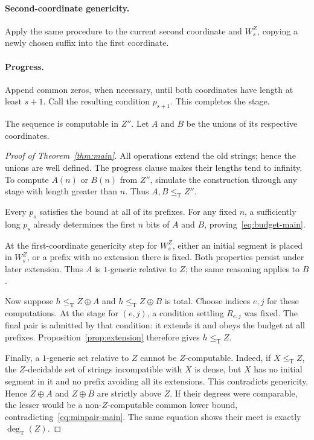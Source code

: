 \documentclass[11pt,a4paper]{article}
\newcommand{\leT}{\leq_{\mathrm T}}
\newcommand{\degT}{\operatorname{deg}_{\mathrm T}}
\theoremstyle{definition}\newtheorem{definition}[theorem]{Definition}
\theoremstyle{remark}\newtheorem{remark}[theorem]{Remark}
\begin{document}
\paragraph{Second-coordinate genericity.}
Apply the same procedure to the current second coordinate and $W_s^Z$, copying a newly chosen suffix into the first coordinate.

\paragraph{Progress.}
Append common zeros, when necessary, until both coordinates have length at least $s+1$. Call the resulting condition $p_{s+1}$. This completes the stage.

The sequence is computable in $Z''$. Let $A$ and $B$ be the unions of its respective coordinates.

\begin{proof}[Proof of Theorem~\ref{thm:main}]
All operations extend the old strings; hence the unions are well defined. The progress clause makes their lengths tend to infinity. To compute $A(n)$ or $B(n)$ from $Z''$, simulate the construction through any stage with length greater than $n$. Thus $A,B\leT Z''$.

Every $p_s$ satisfies the bound at all of its prefixes. For any fixed $n$, a sufficiently long $p_s$ already determines the first $n$ bits of $A$ and $B$, proving~\eqref{eq:budget-main}.

At the first-coordinate genericity step for $W_s^Z$, either an initial segment is placed in $W_s^Z$, or a prefix with no extension there is fixed. Both properties persist under later extension. Thus $A$ is $1$-generic relative to $Z$; the same reasoning applies to $B$.

Now suppose $h\leT Z\oplus A$ and $h\leT Z\oplus B$ is total. Choose indices $e,j$ for these computations. At the stage for $(e,j)$, a condition settling $R_{e,j}$ was fixed. The final pair is admitted by that condition: it extends it and obeys the budget at all prefixes. Proposition~\ref{prop:extension} therefore gives $h\leT Z$.

Finally, a $1$-generic set relative to $Z$ cannot be $Z$-computable. Indeed, if $X\leT Z$, the $Z$-decidable set of strings incompatible with $X$ is dense, but $X$ has no initial segment in it and no prefix avoiding all its extensions. This contradicts genericity. Hence $Z\oplus A$ and $Z\oplus B$ are strictly above $Z$. If their degrees were comparable, the lesser would be a non-$Z$-computable common lower bound, contradicting~\eqref{eq:minpair-main}. The same equation shows their meet is exactly $\degT(Z)$.
\end{proof}
\end{document}
